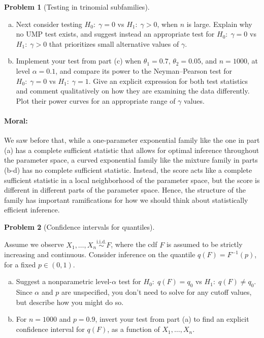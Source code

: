 \documentclass{article}
\newcommand{\simiid}{\overset{\text{i.i.d.}}{\sim}}
\theoremstyle{definition}
\newtheorem{problem}{Problem}
\begin{document}
\begin{problem}[Testing in trinomial subfamilies]
\begin{enumerate}[(a)]
    

    \item Next consider testing  $H_0:\;\gamma = 0$ vs $H_1:\;\gamma >0$, when $n$ is large. Explain why no UMP test exists, and suggest instead an appropriate test for $H_0:\;\gamma = 0$ vs $H_1:\;\gamma > 0$ that prioritizes small alternative values of $\gamma$.

      


    \item Implement your test from part (c) when $\theta_1 = 0.7$, $\theta_2=0.05$, and $n=1000$, at level $\alpha = 0.1$, and compare its power to the Neyman--Pearson test for $H_0:\;\gamma = 0$ vs $H_1:\;\gamma = 1$. Give an explicit expression for both test statistics and comment qualitatively on how they are examining the data differently. Plot their power curves for an appropriate range of $\gamma$ values.
        
      
  \end{enumerate}

  \paragraph{Moral:} We saw before that, while a one-parameter exponential family like the one in part (a) has a complete sufficient statistic that allows for optimal inference throughout the parameter space, a curved exponential family like the mixture family in parts (b-d) has no complete sufficient statistic. Instead, the score acts like a complete sufficient statistic in a local neighborhood of the parameter space, but the score is different in different parts of the parameter space.  Hence, the structure of the family has important ramifications for how we should think about statistically efficient inference.

\end{problem}

\begin{problem}[Confidence intervals for quantiles]
  \label{prob:conf-quantiles}
  
  Assume we observe $X_1,\ldots,X_n \simiid F$, where the cdf $F$ is assumed to be strictly increasing and continuous. Consider inference on the quantile $q(F) = F^{-1}(p)$, for a fixed $p \in (0,1)$.

  \begin{enumerate}[(a)]
  \item Suggest a nonparametric level-$\alpha$ test for $H_0:\; q(F) = q_0$ vs $H_1:\; q(F) \neq q_0$. Since $\alpha$ and $p$ are unspecified, you don't need to solve for any cutoff values, but describe how you might do so.
  \item For $n = 1000$ and $p = 0.9$, invert your test from part (a) to find an explicit confidence interval for $q(F)$, as a function of $X_1,\ldots,X_n$.
  \end{enumerate}
  
\end{problem}
\end{document}
